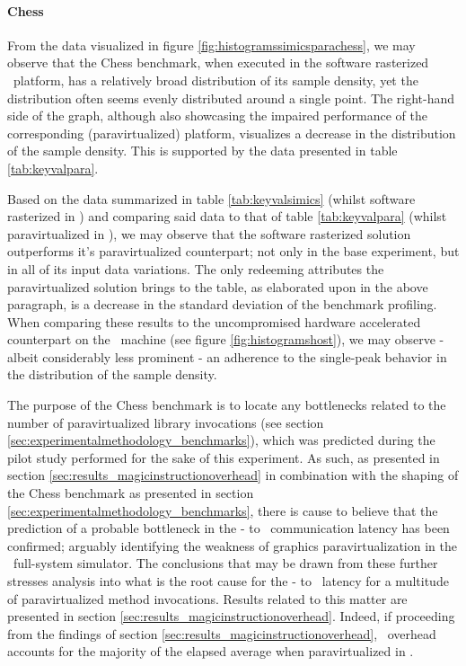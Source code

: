 \paragraph{Chess}
\label{par:results_chess}
From the data visualized in figure \ref{fig:histogramssimicsparachess}, we may observe that the Chess benchmark, when executed in the software rasterized \dvttermsimics\ platform, has a relatively broad distribution of its sample density, yet the distribution often seems evenly distributed around a single point.
The right-hand side of the graph, although also showcasing the impaired performance of the corresponding (paravirtualized) platform, visualizes a decrease in the distribution of the sample density.
This is supported by the data presented in table \ref{tab:keyvalpara}.

Based on the data summarized in table \ref{tab:keyvalsimics} (whilst software rasterized in \dvttermsimics ) and comparing said data to that of table \ref{tab:keyvalpara} (whilst paravirtualized in \dvttermsimics ), we may observe that the software rasterized solution outperforms it's paravirtualized counterpart; not only in the base experiment, but in all of its input data variations.
The only redeeming attributes the paravirtualized solution brings to the table, as elaborated upon in the above paragraph, is a decrease in the standard deviation of the benchmark profiling.
When comparing these results to the uncompromised hardware accelerated counterpart on the \dvttermhost\ machine (see figure \ref{fig:histogramshost}), we may observe - albeit considerably less prominent - an adherence to the single-peak behavior in the distribution of the sample density.

The purpose of the Chess benchmark is to locate any bottlenecks related to the number of paravirtualized library invocations (see section \ref{sec:experimentalmethodology_benchmarks}), which was predicted during the pilot study performed for the sake of this experiment.
As such, as presented in section \ref{sec:results_magicinstructionoverhead} in combination with the shaping of the Chess benchmark as presented in section \ref{sec:experimentalmethodology_benchmarks}, there is cause to believe that the prediction of a probable bottleneck in the \dvttermtarget - to \dvttermhost\ communication latency has been confirmed; arguably identifying the weakness of graphics paravirtualization in the \dvttermsimics\ full-system simulator.
The conclusions that may be drawn from these further stresses analysis into what is the root cause for the \dvttermtarget - to \dvttermhost\ latency for a multitude of paravirtualized method invocations.
Results related to this matter are presented in section \ref{sec:results_magicinstructionoverhead}. 
Indeed, if proceeding from the findings of section \ref{sec:results_magicinstructionoverhead}, \dvttermmagicinstruction\ overhead accounts for the majority of the elapsed average when paravirtualized in \dvttermsimics .

